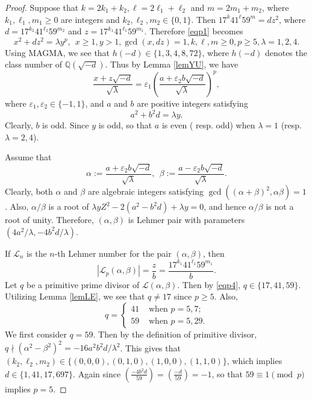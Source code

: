 \documentclass[10pt,a4paper]{amsart}
\begin{document}
\begin{proof}
Suppose that $k=2k_1+k_2, \ell=2\ell_1+\ell_2$ and $m=2m_1+m_2$, where $k_1,\ell_1, m_1\geq 0$ are integers and $k_2,\ell_2,m_2\in\{0,1\}$. Then 
$17^k41^\ell 59^m=dz^2$, where $d=17^{k_2}41^{\ell_2} 59^{m_2}$ and $z=17^{k_1}41^{\ell_1} 59^{m_1}$. 
Therefore \eqref{eqp1} becomes
$$x^2+dz^2=\lambda y^p, ~~x\geq 1, y>1, \gcd(x,dz)=1, k, \ell, m\geq 0, p\geq 5, \lambda =1, 2,4.$$
Using MAGMA, we see that $h(-d)\in\{1,3,4,8,72\}$, where $h(-d)$ denotes the class number of $\mathbb{Q}(\sqrt{-d})$.
Thus by Lemma \ref{lemYU}, we have
\begin{equation}\label{eqp2}
\frac{x+z\sqrt{-d}}{\sqrt{\lambda}}=\varepsilon_1\left(\frac{a+\varepsilon_2 b\sqrt{-d}}{\sqrt{\lambda}}\right)^p,
\end{equation} 
where $\varepsilon_1, \varepsilon_2\in\{-1, 1\}$, and $a$ and $b$ are positive integers satisfying
\begin{equation}\label{eqp3}
a^2+b^2d=\lambda y.
\end{equation}
Clearly, $b$ is odd. Since $y$ is odd, so that $a$ is even ( resp. odd) when $\lambda =1$ (resp. $\lambda = 2, 4$). 

Assume that $$\alpha:=\frac{a+\varepsilon_2 b\sqrt{-d}}{\sqrt{\lambda}},~~\beta:=\frac{a-\varepsilon_2 b\sqrt{-d}}{\sqrt{\lambda}}.$$
Clearly, both $\alpha$ and $\beta$ are algebraic integers satisfying $\gcd((\alpha+\beta)^2, \alpha\beta)=1$. Also, $\alpha/\beta$ is a root of $\lambda yZ^2-2(a^2-b^2d)+\lambda y=0$, and hence $\alpha/\beta$ is not a root of unity. Therefore, $(\alpha, \beta)$ is  Lehmer pair with parameters $(4a^2/\lambda, -4b^2d/\lambda)$. 

If $\mathcal{L}_n$ is the $n$-th Lehmer number for the pair $(\alpha, \beta)$, then 
\begin{equation}\label{eqp4}
|\mathcal{L}_p(\alpha, \beta)|=\frac{z}{b}=\frac{17^{k_1}41^{\ell_1} 59^{m_1}}{b}.
\end{equation}
Let $q$ be a primitive prime divisor of $\mathcal{L}(\alpha, \beta)$. Then by \eqref{eqp4}, $q\in\{17,41,59\}$. Utilizing Lemma \ref{lemLE}, we see that $q\ne 17$ since $p\geq 5$. Also, 
$$q=\begin{cases}
41 & \text{ when } p=5,7;\\
59 & \text{ when } p=5, 29.
\end{cases}
$$
We first consider $q=59$. Then by the definition of primitive divisor, $q\nmid (\alpha^2-\beta^2)^2=-16a^2b^2d/\lambda^2$. This gives that  $(k_2, \ell_2, m_2)\in\{(0,0,0), (0,1,0), (1,0,0), (1,1,0)\}$, which implies $d\in\{1,41,17, 697\}$. Again since $\left(\frac{-4b^2d}{59}\right)=\left(\frac{-d}{59}\right)=-1$, so that $59\equiv 1\pmod p$ implies $p=5$.


\end{proof}
\end{document}

